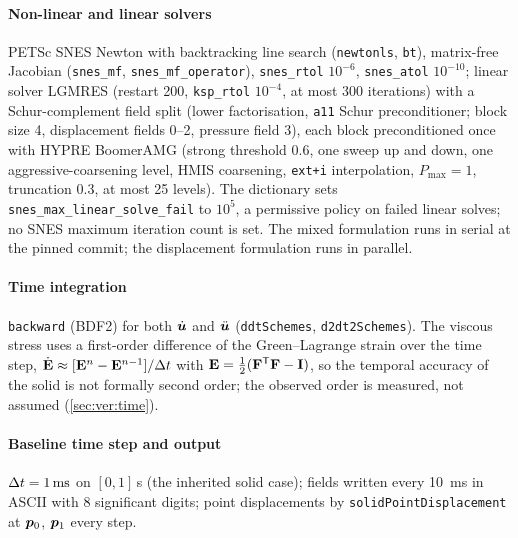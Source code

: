 \paragraph{Non-linear and linear solvers} PETSc SNES Newton with
backtracking line search (\texttt{newtonls}, \texttt{bt}), matrix-free
Jacobian (\texttt{snes\_mf}, \texttt{snes\_mf\_operator}),
\texttt{snes\_rtol} $10^{-6}$, \texttt{snes\_atol} $10^{-10}$; linear solver
LGMRES (restart 200, \texttt{ksp\_rtol} $10^{-4}$, at most 300 iterations)
with a Schur-complement field split (lower factorisation, \texttt{a11}
Schur preconditioner; block size 4, displacement fields 0--2, pressure
field 3), each block preconditioned once with HYPRE BoomerAMG (strong
threshold 0.6, one sweep up and down, one aggressive-coarsening level,
HMIS coarsening, \texttt{ext+i} interpolation, $P_{\max}=1$, truncation
0.3, at most 25 levels). The dictionary sets
\texttt{snes\_max\_linear\_solve\_fail} to $10^5$, a permissive policy on
failed linear solves; no SNES maximum iteration count is set.
 The mixed formulation runs in
serial at the pinned commit; the displacement formulation runs in
parallel.

\paragraph{Time integration} \texttt{backward} (BDF2) for both $\dot{\bm{u}}$
and $\ddot{\bm{u}}$ (\texttt{ddtSchemes}, \texttt{d2dt2Schemes}). The viscous
stress uses a first-order difference of the Green--Lagrange strain over
the time step, $\dot{\mathbf{E}}\approx[\mathbf{E}^{n}-\mathbf{E}^{n-1}]/\Delta t$ with
$\mathbf{E}=\tfrac12(\mathbf{F}^{\mathsf T}\mathbf{F}-\mathbf{I})$, so the temporal accuracy of the
solid is not formally second order; the observed order is measured, not
assumed (\cref{sec:ver:time}). 

\paragraph{Baseline time step and output} $\Delta t=\SI{1}{ms}$ on $[0,1]$\,s
(the inherited solid case); fields written every \SI{10}{ms} in ASCII with
8 significant digits; point displacements by \texttt{solidPointDisplacement}
at $\bm{p}_0$, $\bm{p}_1$ every step.

